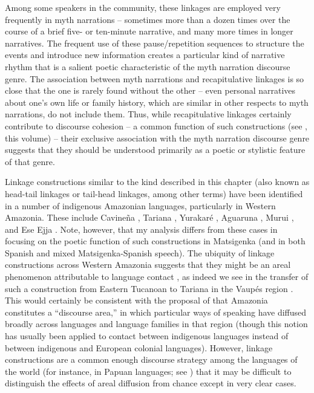 \documentclass[output=paper]{LSP/langsci}
\begin{document}
Among some speakers in the community, these linkages are employed very frequently in myth narrations – sometimes more than a dozen times over the course of a brief five- or ten-minute narrative, and many more times in longer narratives. The frequent use of these pause/repetition sequences to structure the events and introduce new information creates a particular kind of narrative rhythm that is a salient poetic characteristic of the myth narration discourse genre. The association between myth narrations and recapitulative linkages is so close that the one is rarely found without the other – even personal narratives about one’s own life or family history, which are similar in other respects to myth narrations, do not include them. Thus, while recapitulative linkages certainly contribute to discourse cohesion – a common function of such constructions (see \citeauthor{guerin18}, this volume) – their exclusive association with the myth narration discourse genre suggests that they should be understood primarily as a poetic or stylistic feature of that genre.

Linkage constructions similar to the kind described in this chapter (also known as head-tail linkages or tail-head linkages, among other terms) have been identified in a number of indigenous Amazonian languages, particularly in Western Amazonia. These include Cavineña \citep{Guillaume2011}, Tariana \citep[][169--171]{aikhenvald02}, Yurakaré \citep{vangijn14}, Aguaruna \citep{overall14}, Murui \citep[][515--522]{kasia17}, and Ese Ejja \citep[][598--599]{vuill12}. Note, however, that my analysis differs from these cases in focusing on the poetic function of such constructions in Matsigenka (and in both Spanish and mixed Matsigenka-Spanish speech). The ubiquity of linkage constructions across Western Amazonia suggests that they might be an areal phenomenon attributable to language contact \citep[][916]{seifart10}, as indeed we see in the transfer of such a construction from Eastern Tucanoan to Tariana in the Vaupés region \citep[][169--171]{aikhenvald02}. This would certainly be consistent with the proposal of \citet{beieretal.2002} that Amazonia constitutes a ``discourse area,'' in which particular ways of speaking have diffused broadly across languages and language families in that region (though this notion has usually been applied to contact between indigenous languages instead of between indigenous and European colonial languages). However, linkage constructions are a common enough discourse strategy among the languages of the world (for instance, in Papuan languages; see \citealt{devries.2005}) that it may be difficult to distinguish the effects of areal diffusion from chance except in very clear cases.
\end{document}
